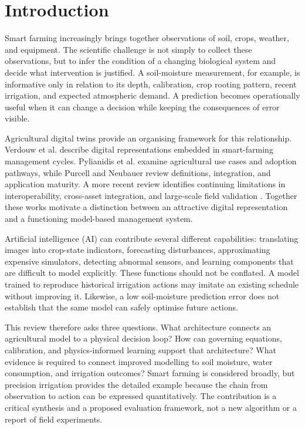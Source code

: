 \documentclass[11pt,a4paper]{article}
\begin{document}
\section{Introduction}

\label{sec:1}

Smart farming increasingly brings together observations of soil, crops, weather, and equipment. The scientific challenge is not simply to collect these observations, but to infer the condition of a changing biological system and decide what intervention is justified. A soil-moisture measurement, for example, is informative only in relation to its depth, calibration, crop rooting pattern, recent irrigation, and expected atmospheric demand. A prediction becomes operationally useful when it can change a decision while keeping the consequences of error visible.

Agricultural digital twins provide an organising framework for this relationship. Verdouw et al. \cite{R01} describe digital representations embedded in smart-farming management cycles. Pylianidis et al. \cite{R02} examine agricultural use cases and adoption pathways, while Purcell and Neubauer \cite{R03} review definitions, integration, and application maturity. A more recent review identifies continuing limitations in interoperability, cross-asset integration, and large-scale field validation \cite{R04}. Together these works motivate a distinction between an attractive digital representation and a functioning model-based management system.

Artificial intelligence (AI) can contribute several different capabilities: translating images into crop-state indicators, forecasting disturbances, approximating expensive simulators, detecting abnormal sensors, and learning components that are difficult to model explicitly. These functions should not be conflated. A model trained to reproduce historical irrigation actions may imitate an existing schedule without improving it. Likewise, a low soil-moisture prediction error does not establish that the same model can safely optimise future actions.

This review therefore asks three questions. What architecture connects an agricultural model to a physical decision loop? How can governing equations, calibration, and physics-informed learning support that architecture? What evidence is required to connect improved modelling to soil moisture, water consumption, and irrigation outcomes? Smart farming is considered broadly, but precision irrigation provides the detailed example because the chain from observation to action can be expressed quantitatively. The contribution is a critical synthesis and a proposed evaluation framework, not a new algorithm or a report of field experiments.
\end{document}
